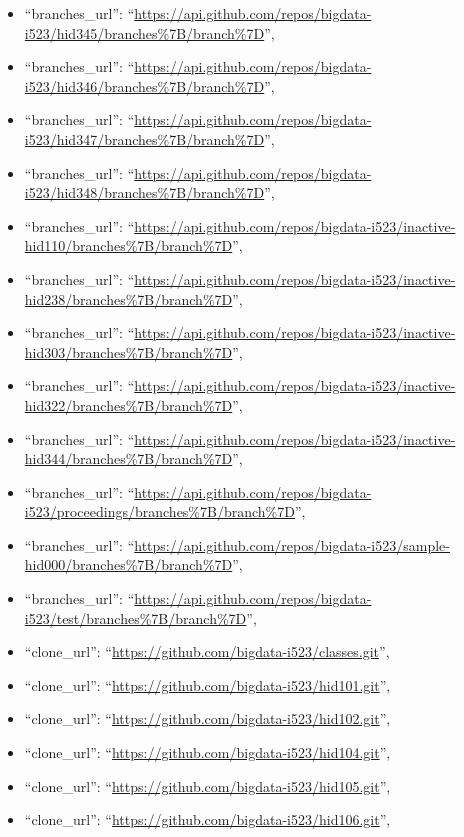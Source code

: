 \begin{itemize}
\item
  ``branches\_url'':
  ``\url{https://api.github.com/repos/bigdata-i523/hid345/branches\%7B/branch\%7D}'',
\item
  ``branches\_url'':
  ``\url{https://api.github.com/repos/bigdata-i523/hid346/branches\%7B/branch\%7D}'',
\item
  ``branches\_url'':
  ``\url{https://api.github.com/repos/bigdata-i523/hid347/branches\%7B/branch\%7D}'',
\item
  ``branches\_url'':
  ``\url{https://api.github.com/repos/bigdata-i523/hid348/branches\%7B/branch\%7D}'',
\item
  ``branches\_url'':
  ``\url{https://api.github.com/repos/bigdata-i523/inactive-hid110/branches\%7B/branch\%7D}'',
\item
  ``branches\_url'':
  ``\url{https://api.github.com/repos/bigdata-i523/inactive-hid238/branches\%7B/branch\%7D}'',
\item
  ``branches\_url'':
  ``\url{https://api.github.com/repos/bigdata-i523/inactive-hid303/branches\%7B/branch\%7D}'',
\item
  ``branches\_url'':
  ``\url{https://api.github.com/repos/bigdata-i523/inactive-hid322/branches\%7B/branch\%7D}'',
\item
  ``branches\_url'':
  ``\url{https://api.github.com/repos/bigdata-i523/inactive-hid344/branches\%7B/branch\%7D}'',
\item
  ``branches\_url'':
  ``\url{https://api.github.com/repos/bigdata-i523/proceedings/branches\%7B/branch\%7D}'',
\item
  ``branches\_url'':
  ``\url{https://api.github.com/repos/bigdata-i523/sample-hid000/branches\%7B/branch\%7D}'',
\item
  ``branches\_url'':
  ``\url{https://api.github.com/repos/bigdata-i523/test/branches\%7B/branch\%7D}'',
\item
  ``clone\_url'': ``\url{https://github.com/bigdata-i523/classes.git}'',
\item
  ``clone\_url'': ``\url{https://github.com/bigdata-i523/hid101.git}'',
\item
  ``clone\_url'': ``\url{https://github.com/bigdata-i523/hid102.git}'',
\item
  ``clone\_url'': ``\url{https://github.com/bigdata-i523/hid104.git}'',
\item
  ``clone\_url'': ``\url{https://github.com/bigdata-i523/hid105.git}'',
\item
  ``clone\_url'': ``\url{https://github.com/bigdata-i523/hid106.git}'',

\end{itemize}
